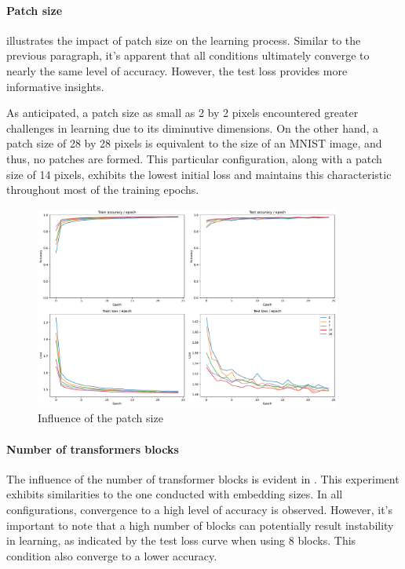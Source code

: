 \paragraph{Patch size}
 illustrates the impact of patch size on the learning process. Similar to the previous paragraph, it's apparent that all conditions ultimately converge to nearly the same level of accuracy. However, the test loss provides more informative insights.

As anticipated, a patch size as small as 2 by 2 pixels encountered greater challenges in learning due to its diminutive dimensions. On the other hand, a patch size of 28 by 28 pixels is equivalent to the size of an MNIST image, and thus, no patches are formed. This particular configuration, along with a patch size of 14 pixels, exhibits the lowest initial loss and maintains this characteristic throughout most of the training epochs.

\begin{figure}[H]
    \centering
    \includegraphics*[width=0.9\textwidth]{figs/Transformers/patch_size_influence_25.pdf}
    \caption{Influence of the patch size}
    \label{fig:patch_size_influence}
\end{figure}

\paragraph{Number of transformers blocks}
The influence of the number of transformer blocks is evident in . This experiment exhibits similarities to the one conducted with embedding sizes. In all configurations, convergence to a high level of accuracy is observed. However, it's important to note that a high number of blocks can potentially result instability in learning, as indicated by the test loss curve when using 8 blocks. This condition also converge to a lower accuracy.


